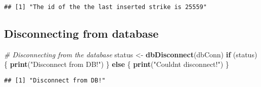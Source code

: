 \documentclass[
]{article}
\newenvironment{Shaded}{\begin{snugshade}}{\end{snugshade}}
\newcommand{\CommentTok}[1]{\textcolor[rgb]{0.56,0.35,0.01}{\textit{#1}}}
\newcommand{\ControlFlowTok}[1]{\textcolor[rgb]{0.13,0.29,0.53}{\textbf{#1}}}
\newcommand{\DecValTok}[1]{\textcolor[rgb]{0.00,0.00,0.81}{#1}}
\newcommand{\FunctionTok}[1]{\textcolor[rgb]{0.13,0.29,0.53}{\textbf{#1}}}
\newcommand{\NormalTok}[1]{#1}
\newcommand{\OtherTok}[1]{\textcolor[rgb]{0.56,0.35,0.01}{#1}}
\newcommand{\SpecialCharTok}[1]{\textcolor[rgb]{0.81,0.36,0.00}{\textbf{#1}}}
\newcommand{\StringTok}[1]{\textcolor[rgb]{0.31,0.60,0.02}{#1}}
\begin{document}
\begin{Shaded}
\end{Shaded}

\begin{verbatim}
## [1] "The id of the the last inserted strike is 25559"
\end{verbatim}

\hypertarget{disconnecting-from-database}{%
\subsection{Disconnecting from
database}\label{disconnecting-from-database}}

\begin{Shaded}
\begin{Highlighting}[]
\CommentTok{\# Disconnecting from the database}
\NormalTok{status }\OtherTok{\textless{}{-}} \FunctionTok{dbDisconnect}\NormalTok{(dbConn)}
\ControlFlowTok{if}\NormalTok{ (status) \{}
  \FunctionTok{print}\NormalTok{(}\StringTok{"Disconnect from DB!"}\NormalTok{)}
\NormalTok{\} }\ControlFlowTok{else}\NormalTok{ \{}
  \FunctionTok{print}\NormalTok{(}\StringTok{"Couldn\textquotesingle{}t disconnect!"}\NormalTok{)}
\NormalTok{\}}
\end{Highlighting}
\end{Shaded}

\begin{verbatim}
## [1] "Disconnect from DB!"
\end{verbatim}
\end{document}
